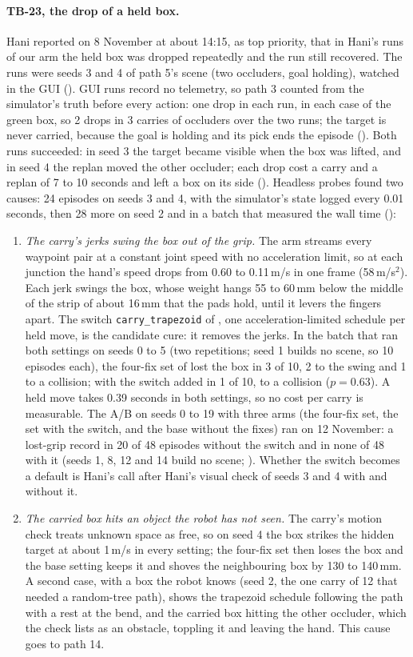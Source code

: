 \paragraph{TB-23, the drop of a held box.} Hani reported on 8 November at about 14:15,
as top priority, that in Hani's runs of our arm the held box was dropped repeatedly
and the run still recovered. The runs were seeds 3 and 4 of path 5's scene (two
occluders, goal holding), watched in the GUI (). GUI runs record no
telemetry, so path 3 counted from the simulator's truth before every action: one drop
in each run, in each case of the green box, so 2 drops in 3 carries of occluders over
the two runs; the target is never carried, because the goal is holding and its pick
ends the episode (). Both runs succeeded: in seed 3 the target became visible when the box was
lifted, and in seed 4 the replan moved the other occluder; each drop cost a carry and
a replan of 7 to 10 seconds and left a box on its side (). Headless probes found
two causes: 24 episodes on seeds 3 and 4, with the simulator's state logged every 0.01
seconds, then 28 more on seed 2 and in a batch that measured the wall time ():
\begin{enumerate}
  \item \emph{The carry's jerks swing the box out of the grip.} The arm streams every
  waypoint pair at a constant joint speed with no acceleration limit, so at each
  junction the hand's speed drops from 0.60 to 0.11\,m/s in one frame (58\,m/s$^2$).
  Each jerk swings the box, whose weight hangs 55 to 60\,mm below the middle of the
  strip of about 16\,mm that the pads hold, until it levers the fingers apart. The
  switch \texttt{carry\_trapezoid} of , one acceleration-limited schedule per
  held move, is the candidate cure: it removes the jerks. In the batch that ran both
  settings on seeds 0 to 5 (two repetitions; seed 1 builds no scene, so 10 episodes
  each), the four-fix set of  lost the box in 3 of 10, 2 to the swing and 1 to a
  collision; with the switch added in 1 of 10, to a collision ($p = 0.63$). A held move
  takes 0.39 seconds in both settings, so no cost per carry is measurable. The A/B on
  seeds 0 to 19 with three arms (the four-fix set, the set with the switch, and the base
  without the fixes) ran on 12 November: a lost-grip record in 20 of 48 episodes without
  the switch and in none of 48 with it (seeds 1, 8, 12 and 14 build no scene;
  ). Whether the switch becomes a default is Hani's
  call after Hani's visual check of seeds 3 and 4 with and without it.
  \item \emph{The carried box hits an object the robot has not seen.} The carry's
  motion check treats unknown space as free, so on seed 4 the box strikes the hidden
  target at about 1\,m/s in every setting; the four-fix set then loses the box and
  the base setting keeps it and shoves the neighbouring box by 130 to 140\,mm. A second
  case, with a box the robot knows (seed 2, the one carry of 12 that needed a
  random-tree path), shows the trapezoid schedule following the path with a rest at the
  bend, and the carried box hitting the other occluder, which the check lists as an
  obstacle, toppling it and leaving the hand. This cause goes to path 14.
\end{enumerate}

